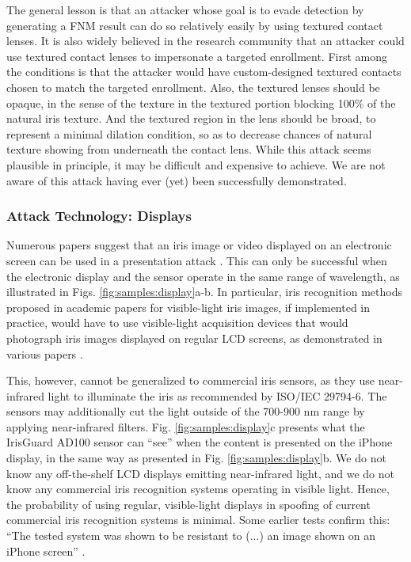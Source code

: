 \documentclass[format=acmsmall, review=false, timestamp=false]{acmart}
\begin{document}
The general lesson is that an attacker whose goal is to evade detection by generating a FNM result can do so relatively easily by using textured contact lenses. It is also widely believed in the research community that an attacker could use textured contact lenses to impersonate a targeted enrollment. First among the conditions is that the attacker would have custom-designed textured contacts chosen to match the targeted enrollment. Also, the textured lenses should be opaque, in the sense of the texture in the textured portion blocking 100\% of the natural iris texture. And the textured region in the lens should be broad, to represent a minimal dilation condition, so as to decrease chances of natural texture showing from underneath the contact lens. While this attack seems plausible in principle, it may be difficult and expensive to achieve. We are not aware of this attack having ever (yet) been successfully demonstrated.


\subsubsection{Attack Technology: Displays}

Numerous papers suggest that an iris image or video displayed on an electronic screen can be used in a presentation attack \cite{HeXiaofu_ICB_2009,Singh_ICT_2011,Huang_WACV_2013,Wei_FRONTEX_2013,Connell_ASSP_2013,Sun_HoBAS_2014,Sequeira_IJCNN_2014,Marsico_PRL_2015,Kumar_NCVPRIPG_2015,He_BTAS_2016,Sequeira_TSP_2016,Fathy_WPC_2017}. This can only be successful when the electronic display and the sensor operate in the same range of wavelength, as illustrated in Figs. \ref{fig:samples:display}a-b. In particular, iris recognition methods proposed in academic papers for visible-light iris images, if implemented in practice, would have to use visible-light acquisition devices that would photograph iris images displayed on regular LCD screens, as demonstrated in various papers \cite{Das_PRL_2016,Raghavendra_IJCB_2014,Raghavendra_TIFS_2015,Raja_BTAS_2015,Raja_SIN_2016,Raja_TIFS_2015}.

This, however, cannot be generalized to commercial iris sensors, as they use near-infrared light to illuminate the iris as recommended by ISO/IEC 29794-6. The sensors may additionally cut the light outside of the 700-900 nm range by applying near-infrared filters. Fig. \ref{fig:samples:display}c presents what the IrisGuard AD100 sensor can ``see'' when the content is presented on the iPhone display, in the same way as presented in Fig. \ref{fig:samples:display}b. We do not know any off-the-shelf LCD displays emitting near-infrared light, and we do not know any commercial iris recognition systems operating in visible light. Hence, the probability of using regular, visible-light displays in spoofing of current commercial iris recognition systems is minimal. Some earlier tests confirm this: ``The tested system was shown to be resistant to (...) an image shown on an iPhone screen'' \cite{Dunstone_BTT_2011}. 
\end{document}
